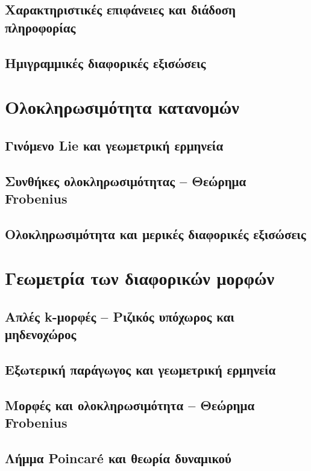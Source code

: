 \documentclass[11pt,a4paper,twoside,openright]{book}
\begin{document}
\section{Χαρακτηριστικές επιφάνειες και διάδοση πληροφορίας}
\section{Ημιγραμμικές διαφορικές εξισώσεις}

\chapter{Ολοκληρωσιμότητα κατανομών}
	\label{chapter:integrability}
	
\section{Γινόμενο Lie και γεωμετρική ερμηνεία}
\section{Συνθήκες ολοκληρωσιμότητας -- Θεώρημα Frobenius}
\section{Ολοκληρωσιμότητα και μερικές διαφορικές εξισώσεις}

\chapter{Γεωμετρία των διαφορικών μορφών}
	\label{chapter:geomtry-of-differential-forms}
	
\section{Απλές k-μορφές -- Ριζικός υπόχωρος και μηδενοχώρος}
\section{Εξωτερική παράγωγος και γεωμετρική ερμηνεία}
	\label{chapter:exterior-derivative}
\section{Μορφές και ολοκληρωσιμότητα -- Θεώρημα Frobenius}
\section{Λήμμα Poincaré και θεωρία δυναμικού}
\end{document}
